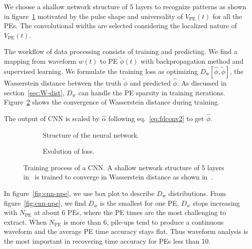 We choose a shallow network structure of 5 layers to recognize patterns as shown in figure~\ref{fig:struct} motivated by the pulse shape and universality of $V_\mathrm{PE}(t)$ for all the PEs.  The convolutional widths are selected considering the localized nature of $V_\mathrm{PE}(t)$.

The workflow of data processing consists of training and predicting. We find a mapping from waveform $w(t)$ to PE $\tilde{\phi}(t)$ with backpropagation method and supervised learning. We formulate the training loss as optimizing $D_\mathrm{w}[\hat{\phi}, \tilde{\phi}] $, the Wasserstein distance between the truth $\tilde{\phi}$ and predicted $\hat{\phi}$. As discussed in section~\ref{sec:W-dist}, $D_w$ can handle the PE sparsity in training iterations. Figure~\ref{fig:loss} shows the convergence of Wasserstein distance during training.

The output of CNN is scaled by $\hat{\alpha}$ following eq.~\eqref{eq:fdconv2} to get $\hat{\phi}$.

\begin{figure}[H]
  \begin{subfigure}{.4\textwidth}
    \centering
    \begin{adjustbox}{width=0.5\textwidth}
      
    \end{adjustbox}
    \caption{\label{fig:struct} Structure of the neural network.}
  \end{subfigure}
  \begin{subfigure}{.5\textwidth}
    \centering
    \resizebox{\textwidth}{!}{}
    \caption{\label{fig:loss} Evolution of loss.}
  \end{subfigure}
  \caption{\label{fig:CNN} Training process of a CNN. A shallow network structure of 5 layers in~ is trained to converge in Wasserstein distance as shown in~.}
\end{figure}

\vspace{-0.5cm}
In figure~\ref{fig:cnn-npe}, we use box plot to describe $D_\mathrm{w}$ distributions. From figure~\ref{fig:cnn-npe}, we find $D_w$ is the smallest for one PE.  $D_w$ stops increasing with $N_\mathrm{PE}$ at about 6 PEs, where the PE times are the most challenging to extract.  When $N_\mathrm{PE}$ is more than 6, pile-ups tend to produce a continuous waveform and the average PE time accuracy stays flat. Thus waveform analysis is the most important in recovering time accuracy for PEs less than 10.

